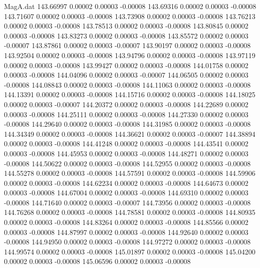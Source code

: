 \begin{filecontents}{MagA.dat}
 143.66997    0.00002    0.00003   -0.00008
 143.69316    0.00002    0.00003   -0.00008
 143.71607    0.00002    0.00003   -0.00008
 143.73908    0.00002    0.00003   -0.00008
 143.76213    0.00002    0.00003   -0.00008
 143.78513    0.00002    0.00003   -0.00008
 143.80845    0.00002    0.00003   -0.00008
 143.83273    0.00002    0.00003   -0.00008
 143.85572    0.00002    0.00003   -0.00007
 143.87861    0.00002    0.00003   -0.00007
 143.90197    0.00002    0.00003   -0.00008
 143.92504    0.00002    0.00003   -0.00008
 143.94796    0.00002    0.00003   -0.00008
 143.97119    0.00002    0.00003   -0.00008
 143.99427    0.00002    0.00003   -0.00008
 144.01758    0.00002    0.00003   -0.00008
 144.04096    0.00002    0.00003   -0.00007
 144.06505    0.00002    0.00003   -0.00008
 144.08843    0.00002    0.00003   -0.00008
 144.11063    0.00002    0.00003   -0.00008
 144.13391    0.00002    0.00003   -0.00008
 144.15716    0.00002    0.00003   -0.00008
 144.18025    0.00002    0.00003   -0.00007
 144.20372    0.00002    0.00003   -0.00008
 144.22689    0.00002    0.00003   -0.00008
 144.25111    0.00002    0.00003   -0.00008
 144.27330    0.00002    0.00003   -0.00008
 144.29640    0.00002    0.00003   -0.00008
 144.31985    0.00002    0.00003   -0.00008
 144.34349    0.00002    0.00003   -0.00008
 144.36621    0.00002    0.00003   -0.00007
 144.38894    0.00002    0.00003   -0.00008
 144.41248    0.00002    0.00003   -0.00008
 144.43541    0.00002    0.00003   -0.00008
 144.45953    0.00002    0.00003   -0.00008
 144.48271    0.00002    0.00003   -0.00008
 144.50622    0.00002    0.00003   -0.00008
 144.52955    0.00002    0.00003   -0.00008
 144.55278    0.00002    0.00003   -0.00008
 144.57591    0.00002    0.00003   -0.00008
 144.59906    0.00002    0.00003   -0.00008
 144.62234    0.00002    0.00003   -0.00008
 144.64673    0.00002    0.00003   -0.00008
 144.67004    0.00002    0.00003   -0.00008
 144.69310    0.00002    0.00003   -0.00008
 144.71640    0.00002    0.00003   -0.00007
 144.73956    0.00002    0.00003   -0.00008
 144.76268    0.00002    0.00003   -0.00008
 144.78581    0.00002    0.00003   -0.00008
 144.80935    0.00002    0.00003   -0.00008
 144.83264    0.00002    0.00003   -0.00008
 144.85566    0.00002    0.00003   -0.00008
 144.87997    0.00002    0.00003   -0.00008
 144.92640    0.00002    0.00003   -0.00008
 144.94950    0.00002    0.00003   -0.00008
 144.97272    0.00002    0.00003   -0.00008
 144.99574    0.00002    0.00003   -0.00008
 145.01897    0.00002    0.00003   -0.00008
 145.04200    0.00002    0.00003   -0.00008
 145.06596    0.00002    0.00003   -0.00008

\end{filecontents}

